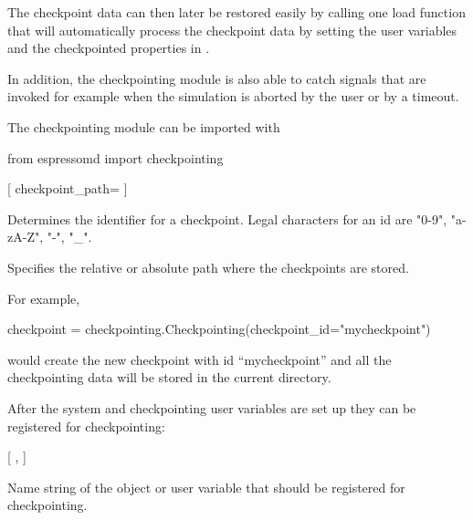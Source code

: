 The checkpoint data can then later be restored easily by calling one load 
function that will automatically process the checkpoint data by setting the 
user variables and the checkpointed properties in \es.

In addition, the checkpointing module is also able to catch 
signals that are invoked for example when the simulation is aborted by the 
user or by a timeout.

\vspace{1em}
The \es checkpointing module can be imported with
\begin{pycode}
    from espressomd import checkpointing 
\end{pycode}

\begin{pysyntax}
  [
    checkpoint_path=
  ]
\end{pysyntax}

\begin{arguments}
\item[\var{checkpoint\_id}] Determines the identifier for a checkpoint. 
Legal characters for an id are "0-9", "a-zA-Z", "-", "_".
\item[\var{checkpoint\_path}] Specifies the relative or absolute path where 
the checkpoints are stored.
\end{arguments}

For example,
\begin{pycode}
    checkpoint = checkpointing.Checkpointing(checkpoint_id="mycheckpoint")
\end{pycode}
would create the new checkpoint with id ``mycheckpoint'' and all the 
checkpointing data will be stored in the current directory.

After the system and checkpointing user variables are 
set up they can be registered for checkpointing:
\begin{pysyntax}
  [
    ,
  ]
\end{pysyntax}
\begin{arguments}
\item[\var{str}] Name string of the \es object or user variable that should be 
registered for checkpointing.
\end{arguments}

